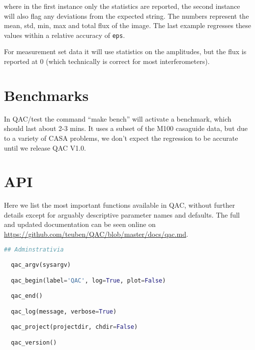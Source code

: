 \documentclass[12pt,a4paper]{article}
\begin{document}
where in the first instance only the statistics are reported, the second instance will also flag any deviations
from the expected string.
The numbers represent the mean, std, min, max and total flux of the image.   The last example
regresses these values within a relative accuracy of \verb+eps+.

For measurement set data it will use statistics on the amplitudes, but
the flux is reported at 0 (which technically is correct for most
interferometers).

\section{Benchmarks}

In QAC/test the command ``make bench'' will activate a benchmark, which should last about 2-3 mins. It uses a subset of the M100
casaguide data, but due to a variety of CASA problems, we don't expect the regression to be accurate until we release QAC V1.0.


\section{API}

Here we list the most important functions available in QAC, without
further details except for arguably descriptive parameter names and
defaults. The full and updated documentation can be seen online on
\url{https://github.com/teuben/QAC/blob/master/docs/qac.md}.

\begin{lstlisting}[language=python]
  ## Adminstrativia

  qac_argv(sysargv)

  qac_begin(label='QAC', log=True, plot=False)

  qac_end()

  qac_log(message, verbose=True)

  qac_project(projectdir, chdir=False)

  qac_version()
\end{lstlisting}
  
\end{document}
